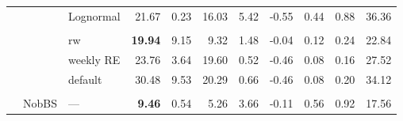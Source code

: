 \documentclass[12pt]{article}
\begin{document}
\begin{table}[!htb]
\begin{tabular}{r | >{\raggedleft\arraybackslash}p{0.55in} | >{\raggedleft\arraybackslash}p{0.85in} | r r r r r r r r}
& & \cellcolor{delayA!25}Lognormal & \cellcolor{delayA!25}21.67 & \cellcolor{delayA!25}0.23 & \cellcolor{delayA!25}16.03 & \cellcolor{delayA!25}5.42 & \cellcolor{delayA!25}-0.55 & \cellcolor{delayA!25}0.44 & \cellcolor{delayA!25}0.88 & \cellcolor{delayA!25}36.36 \\
\\
& \multirow{3}{*}{\texttt{epinowcast}}
& rw          & \bf 19.94 & 9.15 & 9.32 & 1.48 & -0.04 & 0.12 & 0.24 & 22.84 \\
& & weekly RE   & 23.76 & 3.64 & 19.60 & 0.52 & -0.46 & 0.08 & 0.16 & 27.52 \\
& & default     & 30.48 & 9.53 & 20.29 & 0.66 & -0.46 & 0.08 & 0.20 & 34.12 \\
\\
& NobBS & — & \bf 9.46 & 0.54 & 5.26 & 3.66 & -0.11 & 0.56 & 0.92 & 17.56 \\

\midrule


\end{tabular}
\end{table}
\end{document}
